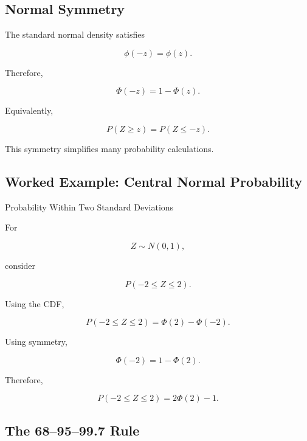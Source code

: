 \subsection{Normal Symmetry}
\label{subsec:normal-symmetry}

The standard normal density satisfies

\[
\phi(-z)=\phi(z).
\]

Therefore,

\[
\boxed{
\Phi(-z)
=
1-\Phi(z).
}
\]

Equivalently,

\[
\boxed{
P(Z\geq z)
=
P(Z\leq-z).
}
\]

This symmetry simplifies many probability calculations.

\subsection{Worked Example: Central Normal Probability}
\label{subsec:worked-central-normal}

\begin{workedexamplebox}{Probability Within Two Standard Deviations}

For

\[
Z\sim N(0,1),
\]

consider

\[
P(-2\leq Z\leq2).
\]

Using the CDF,

\[
P(-2\leq Z\leq2)
=
\Phi(2)-\Phi(-2).
\]

Using symmetry,

\[
\Phi(-2)=1-\Phi(2).
\]

Therefore,

\begin{answerbox}
\[
\boxed{
P(-2\leq Z\leq2)
=
2\Phi(2)-1.
}
\]
\end{answerbox}

\end{workedexamplebox}

\subsection{The 68--95--99.7 Rule}
\label{subsec:empirical-rule-normal}


